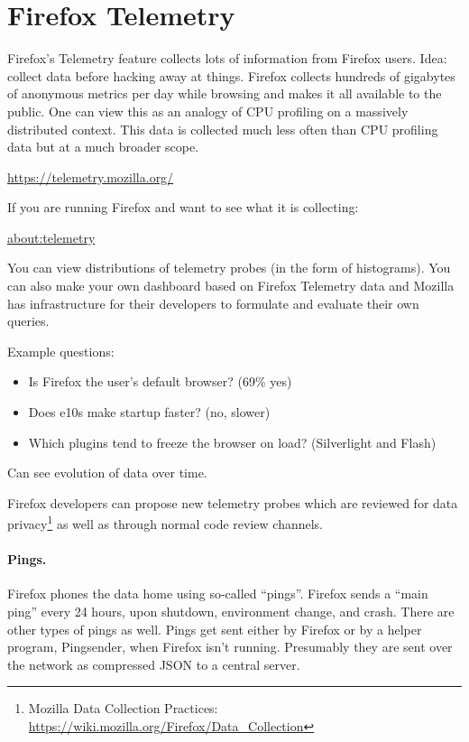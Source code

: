 \documentclass[a4paper]{report}
\begin{document}
\section*{Firefox Telemetry}
Firefox's Telemetry feature collects lots of information from Firefox
users.  Idea: collect data before hacking away at things.  Firefox collects hundreds of
gigabytes of anonymous metrics per day while browsing and makes it all available to
the public.  One can view this as an analogy of CPU profiling on a
massively distributed context. This data is collected much less often than
CPU profiling data but at a much broader scope.
\begin{center}
\url{https://telemetry.mozilla.org/}
\end{center}
If you are running Firefox and want to see what it is collecting:
\begin{center}
\url{about:telemetry}
\end{center}

You can view distributions of telemetry probes (in the form of
histograms). You can also make your own dashboard based on Firefox
Telemetry data and Mozilla has infrastructure for their developers to
formulate and evaluate their own queries.

Example questions:
\begin{itemize}[noitemsep]
\item Is Firefox the user's default browser? (69\% yes)
\item Does e10s make startup faster? (no, slower)
\item Which plugins tend to freeze the browser on load? (Silverlight and Flash)
\end{itemize}
Can see evolution of data over time.

Firefox developers can propose new telemetry probes which are reviewed
for data privacy\footnote{Mozilla Data Collection Practices: \url{https://wiki.mozilla.org/Firefox/Data_Collection}} as well as through normal code review channels.

\paragraph{Pings.} Firefox phones the data home using so-called ``pings''.
Firefox sends a ``main ping'' every 24 hours, upon shutdown, environment change,
and crash. There are other types of pings as well. Pings get sent either by Firefox
or by a helper program, Pingsender, when Firefox isn't running. Presumably they
are sent over the network as compressed JSON to a central server.
\end{document}
